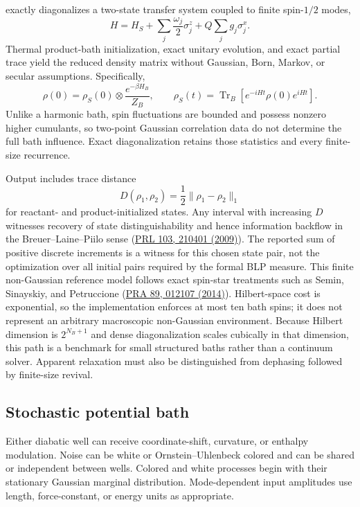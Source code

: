 \documentclass[11pt]{article}
\newcommand{\code}[1]{\texttt{\detokenize{#1}}}
\begin{document}
\code{spin_bath_non_gaussian.py} exactly diagonalizes a two-state transfer system
coupled to finite spin-$1/2$ modes,
\begin{equation}
 H=H_S+\sum_j\frac{\omega_j}{2}\sigma_j^z+
 Q\sum_j g_j\sigma_j^x.
\end{equation}
Thermal product-bath initialization, exact unitary evolution, and exact partial trace
yield the reduced density matrix without Gaussian, Born, Markov, or secular
assumptions. Specifically,
\begin{equation}
 \rho(0)=\rho_S(0)\otimes\frac{e^{-\beta H_B}}{Z_B},\qquad
 \rho_S(t)=\operatorname{Tr}_B\!\left[e^{-iHt}\rho(0)e^{iHt}\right].
\end{equation}
Unlike a harmonic bath, spin fluctuations are bounded and possess nonzero higher
cumulants, so two-point Gaussian correlation data do not determine the full bath
influence. Exact diagonalization retains those statistics and every finite-size
recurrence.

Output includes trace distance
\begin{equation}
 D(\rho_1,\rho_2)=\frac12\lVert\rho_1-\rho_2\rVert_1
\end{equation}
for reactant- and product-initialized states. Any interval with increasing $D$
witnesses recovery of state distinguishability and hence information backflow in
the Breuer--Laine--Piilo sense
(\href{https://doi.org/10.1103/PhysRevLett.103.210401}{PRL 103, 210401 (2009)}).
The reported sum of positive discrete increments is a witness for this chosen state
pair, not the optimization over all initial pairs required by the formal BLP measure.
This finite non-Gaussian reference model follows exact spin-star treatments such as Semin,
Sinayskiy, and Petruccione
(\href{https://doi.org/10.1103/PhysRevA.89.012107}{PRA 89, 012107 (2014)}).
Hilbert-space cost is exponential, so the implementation enforces at most ten bath
spins; it does not represent an arbitrary macroscopic non-Gaussian environment.
Because Hilbert dimension is $2^{N_B+1}$ and dense diagonalization scales cubically
in that dimension, this path is a benchmark for small structured baths rather than a
continuum solver. Apparent relaxation must also be distinguished from dephasing
followed by finite-size revival.

\subsection{Stochastic potential bath}

Either diabatic well can receive coordinate-shift, curvature, or enthalpy
modulation. Noise can be white or Ornstein--Uhlenbeck colored and can be shared
or independent between wells. Colored and white processes begin with their
stationary Gaussian marginal distribution. Mode-dependent input amplitudes use
length, force-constant, or energy units as appropriate.
\end{document}
